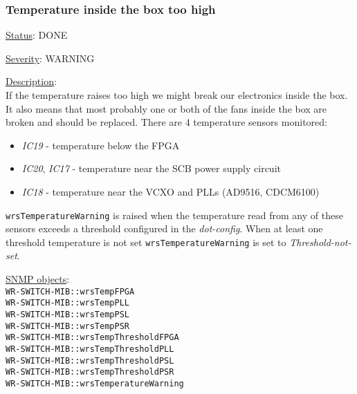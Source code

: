 \subsubsection{\bf Temperature inside the box too high}
		\label{fail:other:temp}
		\begin{packed_enum}
			\item [] \underline{Status}: DONE
			\item [] \underline{Severity}: WARNING
			\item [] \underline{Description}:\\
				If the temperature raises too high we might break our electronics inside
				the box. It also means that most probably one or both of the fans inside
				the box are broken and should be replaced. There are 4 temperature
				sensors monitored:
				\begin{itemize}
					\item \emph{IC19} - temperature below the FPGA
					\item \emph{IC20}, \emph{IC17} - temperature near the SCB power supply
						circuit
					\item \emph{IC18} - temperature near the VCXO and PLLs (AD9516,
						CDCM6100)
				\end{itemize}
				\texttt{wrsTemperatureWarning} is raised when the temperature read from
				any of these sensors exceeds a threshold configured in the
				\emph{dot-config}. When at least one threshold temperature is not set
				\texttt{wrsTemperatureWarning} is set to \emph{Threshold-not-set}.
			\item [] \underline{SNMP objects}:\\
				\texttt{WR-SWITCH-MIB::wrsTempFPGA}\\
				\texttt{WR-SWITCH-MIB::wrsTempPLL}\\
				\texttt{WR-SWITCH-MIB::wrsTempPSL}\\
				\texttt{WR-SWITCH-MIB::wrsTempPSR}\\
				\texttt{WR-SWITCH-MIB::wrsTempThresholdFPGA}\\
				\texttt{WR-SWITCH-MIB::wrsTempThresholdPLL}\\
				\texttt{WR-SWITCH-MIB::wrsTempThresholdPSL}\\
				\texttt{WR-SWITCH-MIB::wrsTempThresholdPSR}\\
				\texttt{WR-SWITCH-MIB::wrsTemperatureWarning}
		\end{packed_enum}

